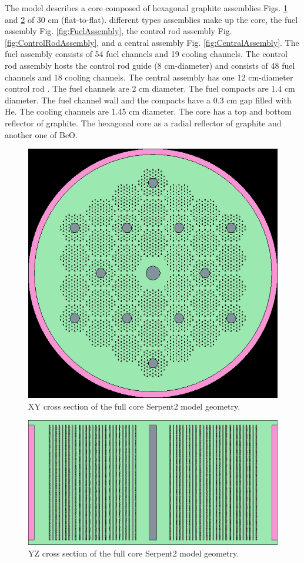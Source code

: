The model describes a core composed of hexagonal graphite assemblies Figs. \ref{fig:FullXY} and \ref{fig:FullYZ} of 30 cm (flat-to-flat).  different types assemblies make up the core, the fuel assembly Fig. \ref{fig:FuelAssembly}, the control rod assembly Fig. \ref{fig:ControlRodAssembly}, and a central assembly Fig. \ref{fig:CentralAssembly}. The fuel assembly consists of 54 fuel channels and 19 cooling channels. The control rod assembly hosts the control rod guide (8 cm-diameter) and consists of 48 fuel channels and 18 cooling channels. The central assembly has one 12 cm-diameter control rod \cite{hawari_development_2018}. The fuel channels are 2 cm diameter. The fuel compacts are 1.4 cm diameter. The fuel channel wall and the compacts have a 0.3 cm gap filled with He. The cooling channels are 1.45 cm diameter. The core has a top and bottom reflector of graphite. The hexagonal core as a radial reflector of graphite and another one of BeO.

\begin{figure}[H]
	\centering
	\includegraphics[width=0.45\linewidth]{figures/MMR_full_stack_geom1.png}
	\hfill
	\caption{XY cross section of the full core Serpent2 model geometry.}
	\label{fig:FullXY}
\end{figure}

\begin{figure}[H]
	\centering
	\includegraphics[width=0.6\linewidth]{figures/MMR_full_stack_geom2.png}
	\hfill
	\caption{YZ cross section of the full core Serpent2 model geometry.}
	\label{fig:FullYZ}
\end{figure}

